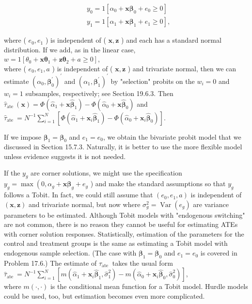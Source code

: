 \documentclass[10pt]{article}
\begin{document}
\begin{align*}
& y_{0}=1\left[\alpha_{0}+\mathbf{x} \boldsymbol{\beta}_{0}+e_{0} \geq 0\right]  \tag{21.110}\\
& y_{1}=1\left[\alpha_{1}+\mathbf{x} \boldsymbol{\beta}_{1}+e_{1} \geq 0\right], \tag{21.111}
\end{align*}


where ( $e_{0}, e_{1}$ ) is independent of ( $\mathbf{x}, \mathbf{z}$ ) and each has a standard normal distribution. If we add, as in the linear case,\\
$w=1\left[\theta_{0}+\mathbf{x} \boldsymbol{\theta}_{1}+\mathbf{z} \boldsymbol{\theta}_{2}+a \geq 0\right]$,\\
where ( $e_{0}, e_{1}, a$ ) is independent of ( $\mathbf{x}, \mathbf{z}$ ) and trivariate normal, then we can estimate $\left(\alpha_{0}, \boldsymbol{\beta}_{0}^{\prime}\right)^{\prime}$ and $\left(\alpha_{1}, \boldsymbol{\beta}_{1}^{\prime}\right)^{\prime}$ by "selection" probits on the $w_{i}=0$ and $w_{i}=1$ subsamples, respectively; see Section 19.6.3. Then $\hat{\tau}_{\text {ate }}(\mathbf{x})=\Phi\left(\hat{\alpha}_{1}+\mathbf{x} \hat{\boldsymbol{\beta}}_{1}\right)-\Phi\left(\hat{\alpha}_{0}+\mathbf{x} \hat{\boldsymbol{\beta}}_{0}\right)$ and\\
$\hat{\tau}_{\text {ate }}=N^{-1} \sum_{i=1}^{N}\left[\Phi\left(\hat{\alpha}_{1}+\mathbf{x}_{i} \hat{\boldsymbol{\beta}}_{1}\right)-\Phi\left(\hat{\alpha}_{0}+\mathbf{x}_{i} \hat{\boldsymbol{\beta}}_{0}\right)\right]$.

If we impose $\boldsymbol{\beta}_{1}=\boldsymbol{\beta}_{0}$ and $e_{1}=e_{0}$, we obtain the bivariate probit model that we discussed in Section 15.7.3. Naturally, it is better to use the more flexible model unless evidence suggests it is not needed.

If the $y_{g}$ are corner solutions, we might use the specification $y_{g}=\max \left(0, \alpha_{g}+\right. \mathbf{x} \boldsymbol{\beta}_{g}+e_{g}$ ) and make the standard assumptions so that $y_{g}$ follows a Tobit. In fact, we could still assume that $\left(e_{0}, e_{1}, a\right)$ is independent of $(\mathbf{x}, \mathbf{z})$ and trivariate normal, but now where $\sigma_{g}^{2}=\operatorname{Var}\left(e_{g}\right)$ are variance parameters to be estimated. Although Tobit models with "endogenous switching" are not common, there is no reason they cannot be useful for estimating ATEs with corner solution responses. Statistically, estimation of the parameters for the control and treatment groups is the same as estimating a Tobit model with endogenous sample selection. (The case with $\boldsymbol{\beta}_{1}=\boldsymbol{\beta}_{0}$ and $e_{1}=e_{0}$ is covered in Problem 17.6.) The estimate of $\tau_{\text {ate }}$ takes the usual form\\
$\hat{\tau}_{\text {ate }}=N^{-1} \sum_{i=1}^{N}\left[m\left(\hat{\alpha}_{1}+\mathbf{x}_{i} \hat{\boldsymbol{\beta}}_{1}, \hat{\sigma}_{1}^{2}\right)-m\left(\hat{\alpha}_{0}+\mathbf{x}_{i} \hat{\boldsymbol{\beta}}_{0}, \hat{\sigma}_{0}^{2}\right)\right]$,\\
where $m(\cdot, \cdot)$ is the conditional mean function for a Tobit model. Hurdle models could be used, too, but estimation becomes even more complicated.
\end{document}
